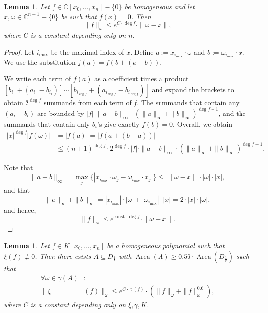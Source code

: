\documentclass[reqno]{amsart}
\theoremstyle{plain}
\newtheorem{Lem}[Cor]{Lemma}
\theoremstyle{definition}
\theoremstyle{remark}
\theoremstyle{plain}
\begin{document}
\begin{Lem}\label{Lemma f(omega)<|f|*rho}
Let $f\in\mathbb C[x_0,...,x_n] -\{0\}$ be homogeneous and let $x,\omega\in\mathbb C^{n+1}-\{0\}$ be such that $f(x)=0$. Then
\[
    \|f\|_\omega
        \leq
    e^{C\cdot\deg f}\cdot\|\omega-x\|
,\]
where $C$ is a constant depending only on $n$.
\end{Lem}

\begin{proof}
Let $i_\mathrm{max}$ be the maximal index of $x$. Define $a:=x_{i_\mathrm{max}}\cdot\omega$ and $b:=\omega_{i_\mathrm{max}}\cdot x$. We use the substitution $f(a)=f(b+(a-b))$.

We write each term of $f(a)$ as a coefficient times a product $[b_{i_1}+(a_{i_1}-b_{i_1})]\cdots[b_{i_{\deg f}}+(a_{i_{\deg f}}-b_{i_{\deg f}})]$ and expand the brackets to obtain $2^{\deg f}$ summands from each term of $f$. The summands that contain any $(a_i-b_i)$ are bounded by $|f|\cdot\|a-b\|_\infty\cdot(\|a\|_\infty+\|b\|_\infty)^{\deg f-1}$, and the summands that contain only $b_i$'s give exactly $f(b)=0$. Overall, we obtain
\begin{align*}
    |x|^{\deg f}|f(\omega)|
        &=
    |f(a)|
        =
    |f(a+(b-a))|\\
        &\leq
   (n+1)^{\deg f}\cdot 2^{\deg f}\cdot|f|\cdot\|a-b\|_\infty\cdot(\|a\|_\infty+\|b\|_\infty)^{\deg f-1}
.\end{align*}

Note that
\[
    \|a-b\|_\infty
        =
    \max_j\{|x_{i_\mathrm{max}}\cdot\omega_j-\omega_{i_\mathrm{max}}\cdot x_j|\}
        \leq\
    \|\omega-x\|\cdot |\omega|\cdot|x|
,\]
and that
\[
    \|a\|_\infty+\|b\|_\infty
        =
    |x_{i_\mathrm{max}}|\cdot|\omega|+|\omega_{i_\mathrm{max}}|\cdot|x|
        =
    2\cdot|x|\cdot|\omega|
,\]
and hence,
\[
    \|f\|_\omega
        \leq
    e^{\mathrm{const}\cdot\deg f}\cdot\|\omega-x\|
.\]
\end{proof}

\begin{Lem}\label{Lemma bound on xi(f)(omega)}
Let $f\in K[x_0,...,x_n]$ be a homogeneous polynomial such that $\xi(f)\not\equiv 0$. Then there exists $A\subseteq\overline{D_\frac1e}$ with $\operatorname{Area}(A)\geq 0.56\cdot\operatorname{Area}\left(\overline{D_\frac1e}\right)$ such that
\begin{align*}
    \forall\omega\in\gamma(A)&:\\
    \|\xi&(f)\|_\omega
        \leq
    e^{C\cdot\operatorname{t}(f)}\cdot\left(\|f\|_\omega+\|f\|_\omega^{0.6}\right)
,\end{align*}
where $C$ is a constant depending only on $\xi,\gamma,K$.
\end{Lem}
\end{document}
